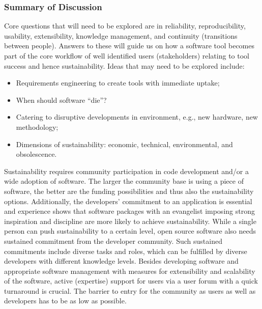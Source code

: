 \subsubsection{Summary of Discussion}

Core questions that will need to be explored are in reliability,
reproducibility, usability, extensibility, knowledge management, and continuity
(transitions between people). Answers to these will guide us on how a software
tool becomes part of the core workflow of well identified users (stakeholders)
relating to tool success and hence sustainability.
Ideas that may need to be explored include:
\begin{itemize}

\item Requirements engineering to create tools with immediate uptake;

\item When should software ``die''?

\item Catering to disruptive developments in environment, e.g., new hardware,
new methodology;

\item Dimensions of sustainability: economic, technical, environmental,
and obsolescence.

\end{itemize}

Sustainability requires community participation in code development and/or a
wide adoption of software. The larger the community base is using a piece of
software, the better are the funding possibilities and thus also the
sustainability options. Additionally, the developers’ commitment to an application is
essential and experience shows that software packages with an evangelist
imposing strong inspiration and discipline are more likely to achieve
sustainability. While a single person can push sustainability to a certain
level, open source software also needs sustained commitment from the developer
community. Such sustained commitments include diverse tasks and roles, which can
be fulfilled by diverse developers with different knowledge levels. Besides
developing software and appropriate software management with measures for
extensibility and scalability of the software, active (expertise) support for
users via a user forum with a quick turnaround is crucial. The barrier to entry
for the community as users as well as developers has to be as low as possible.

